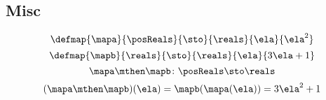 \begin{forslides}
    \subsection{Misc}

    \begin{equation}
        \label{eq:slides_session2_198}
        \defmap{\mapa}{\posReals}{\sto}{\reals}{\ela}{\ela^2}
    \end{equation}
    \begin{equation}
        \label{eq:slides_session2_199}
        \defmap{\mapb}{\reals}{\sto}{\reals}{\ela}{3\ela + 1}
    \end{equation}
    \begin{equation}
        \label{eq:slides_session2_200}
        \mapa \mthen \mapb \colon \posReals \sto \reals
    \end{equation}
    \begin{equation}
        \label{eq:slides_session2_201}
        (\mapa \mthen \mapb)(\ela) = \mapb(\mapa(\ela)) = 3 \ela^2 + 1
    \end{equation}

\end{forslides}

